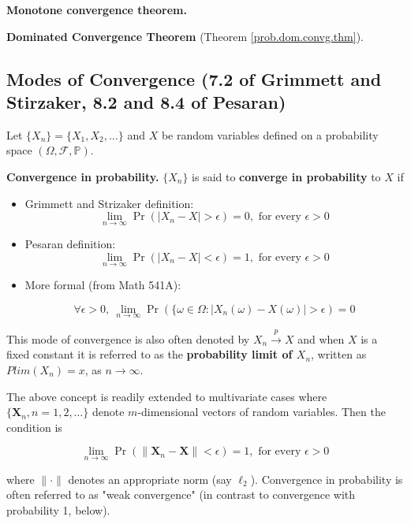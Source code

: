 \textbf{Monotone convergence theorem.}

\textbf{Dominated Convergence Theorem} (Theorem \ref{prob.dom.convg.thm}).

\subsection{Modes of Convergence (7.2 of Grimmett and Stirzaker, 8.2 and 8.4 of Pesaran)}

 Let \(\{X_n\} = \{X_1, X_2, \ldots\}\) and \(X\) be random variables defined on a probability space \((\Omega, \mathcal{F}, \mathbb{P})\).

\begin{definition} \textbf{Convergence in probability.} \(\{X_n\}\) is said to \textbf{converge in probability} to \(X\) if
\begin{itemize}

\item Grimmett and Strizaker definition:
\[
\lim_{n \to \infty} \Pr(|X_n -X| > \epsilon) = 0, \text{ for every } \epsilon > 0
\]

\item Pesaran definition:
\[
\lim_{n \to \infty} \Pr(|X_n -X| < \epsilon) = 1, \text{ for every } \epsilon > 0
\]

\item More formal (from Math 541A):

\[
\forall \epsilon > 0, \ \lim_{n \to \infty} \Pr(\{\omega \in \Omega : |X_n(\omega) - X(\omega)| > \epsilon) = 0
\]

\end{itemize}

\begin{remark}This mode of convergence is also often denoted by \(X_n \xrightarrow{p} X\) and when \(X\) is a fixed constant it is referred to as the \textbf{probability limit of \(X_n\)}, written as \(Plim(X_n) = x\), as \(n \to \infty\).

The above concept is readily extended to multivariate cases where \(\{ \boldsymbol{X}_n, n = 1, 2, \ldots \}\) denote \(m\)-dimensional vectors of random variables. Then the condition is

\[
\lim_{n \to \infty} \Pr(\lVert \boldsymbol{X}_n -\boldsymbol{X}\rVert  < \epsilon) = 1, \text{ for every } \epsilon > 0
\]

where \(\lVert \cdot \rVert \) denotes an appropriate norm (say \(\ell_2\)). Convergence in probability is often referred to as "weak convergence" (in contrast to convergence with probability 1, below).
\end{remark}
\end{definition} 

